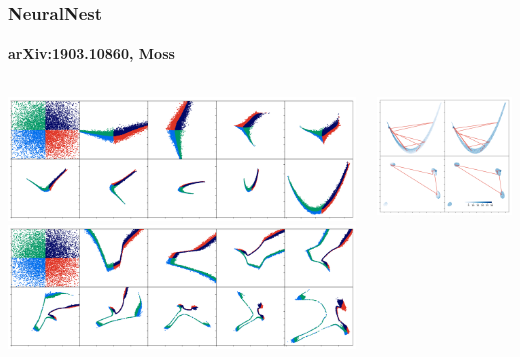 \documentclass[%
]{beamer}
\begin{document}
\begin{frame}
  \frametitle{NeuralNest}
  \framesubtitle{arXiv:1903.10860, Moss}
    \begin{columns}
        \begin{column}{0.55\textwidth}
            \includegraphics[width=\textwidth]{figures/rosenbrock_flow.png}
            \includegraphics[width=\textwidth]{figures/himmelblau_flow.png}
        \end{column}
        \begin{column}{0.45\textwidth}
            \includegraphics[width=\textwidth]{figures/chains.png}
        \end{column}
    \end{columns}
\end{frame}
\end{document}
